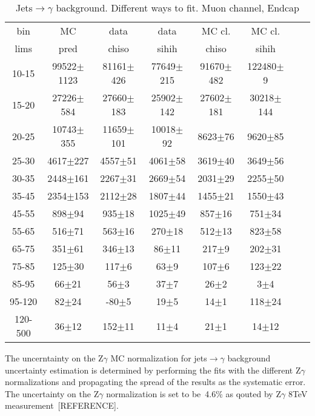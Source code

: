 \begin{table}[h]
  \tiny
  \begin{center}
  \caption{Jets$\rightarrow\gamma$ background. Different ways to fit. Muon channel, Endcap}
  \begin{tabular}{|c|c|c|c|c|c|c|c|}
    bin &  MC   & data  & data  & MC cl. & MC cl.\\ 
    lims & pred & chiso & sihih & chiso  & sihih \\ \hline
10-15 & 99522$\pm$1123 & 81161$\pm$426 & 77649$\pm$215 & 91670$\pm$482 & 122480$\pm$9   \\ \hline
15-20 & 27226$\pm$584 & 27660$\pm$183 & 25902$\pm$142 & 27602$\pm$181 & 30218$\pm$144   \\ \hline
20-25 & 10743$\pm$355 & 11659$\pm$101 & 10018$\pm$92 & 8623$\pm$76 & 9620$\pm$85   \\ \hline
25-30 & 4617$\pm$227 & 4557$\pm$51 & 4061$\pm$58 & 3619$\pm$40 & 3649$\pm$56   \\ \hline
30-35 & 2448$\pm$161 & 2267$\pm$31 & 2669$\pm$54 & 2031$\pm$29 & 2255$\pm$50   \\ \hline
35-45 & 2354$\pm$153 & 2112$\pm$28 & 1807$\pm$44 & 1455$\pm$21 & 1550$\pm$43   \\ \hline
45-55 & 898$\pm$94 & 935$\pm$18 & 1025$\pm$49 & 857$\pm$16 & 751$\pm$34   \\ \hline
55-65 & 516$\pm$71 & 563$\pm$16 & 270$\pm$18 & 512$\pm$13 & 823$\pm$58   \\ \hline
65-75 & 351$\pm$61 & 346$\pm$13 & 86$\pm$11 & 217$\pm$9 & 202$\pm$31   \\ \hline
75-85 & 125$\pm$30 & 117$\pm$6 & 63$\pm$9 & 107$\pm$6 & 123$\pm$22   \\ \hline
85-95 & 66$\pm$21 & 56$\pm$3 & 37$\pm$7 & 26$\pm$2 & 3$\pm$4   \\ \hline
95-120 & 82$\pm$24 & -80$\pm$5 & 19$\pm$5 & 14$\pm$1 & 118$\pm$24   \\ \hline
120-500 & 36$\pm$12 & 152$\pm$11 & 11$\pm$4 & 21$\pm$1 & 14$\pm$12   \\ \hline

  \end{tabular}
  \label{tab:Jets_to_gamma_diff_ways_to_fit_1}
  \end{center}
\end{table}


The uncerntainty on the Z$\gamma$ MC normalization for jets$\rightarrow\gamma$ background uncertainty estimation is determined by performing the fits with the different Z$\gamma$ normalizations and propagating the spread of the results as the systematic error. The uncertainty on the Z$\gamma$ normalization is set to be~4.6\% as qouted by Z$\gamma$ 8TeV measurement~[REFERENCE].

